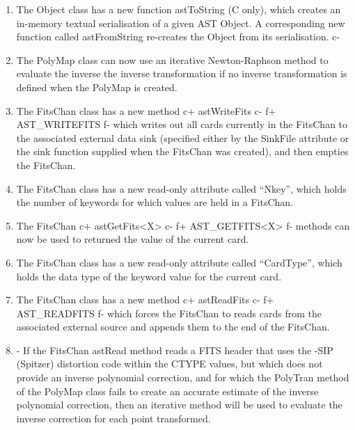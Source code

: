 \documentclass[twoside,11pt]{starlink}
\begin{document}
\begin{enumerate}

c+
\item The Object class has a new function astToString (C only), which creates
an in-memory textual serialisation of a given AST Object. A corresponding
new function called astFromString re-creates the Object from its
serialisation.
c-

\item The PolyMap class can now use an iterative Newton-Raphson method to
evaluate the inverse the inverse transformation if no inverse
transformation is defined when the PolyMap is created.

\item The FitsChan class has a new method
c+
astWriteFits
c-
f+
AST\_WRITEFITS
f-
which writes out all cards currently in the FitsChan to the associated
external data sink (specified either by the SinkFile attribute or the
sink function supplied when the FitsChan was created), and then empties
the FitsChan.

\item The FitsChan class has a new read-only attribute called ``Nkey'', which
holds the number of keywords for which values are held in a FitsChan.

\item The FitsChan
c+
astGetFits<X>
c-
f+
AST\_GETFITS<X>
f-
methods can now be used to returned the value of the current card.

\item The FitsChan class has a new read-only attribute called ``CardType'', which
holds the data type of the keyword value for the current card.

\item The FitsChan class has a new method
c+
astReadFits
c-
f+
AST\_READFITS
f-
which forces the FitsChan to reads cards from the associated external
source and appends them to the end of the FitsChan.

\item - If the FitsChan astRead method reads a FITS header that uses the
-SIP (Spitzer) distortion code within the CTYPE values, but which does
not provide an inverse polynomial correction, and for which the PolyTran
method of the PolyMap class fails to create an accurate estimate of the
inverse polynomial correction, then an iterative method will be used to
evaluate the inverse correction for each point transformed.

\end{enumerate}
\end{document}
